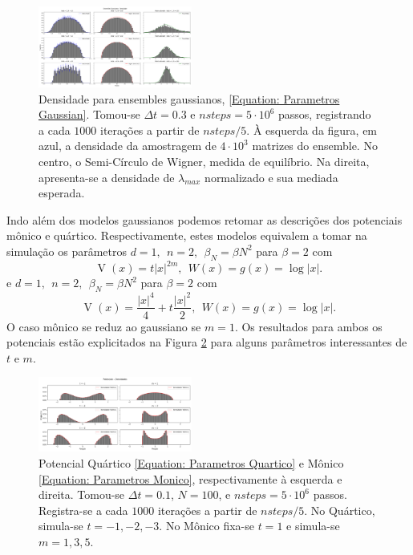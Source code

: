 \documentclass[11pt,twocolumn]{article}
\DeclareMathOperator{\V}{V}
\numberwithin{equation}{section} %
\begin{document}
\begin{figure}[ht!]
	\centering
	\includegraphics[width=0.45\textwidth]{figures/validationGaussianTracy.png}
	\caption{Densidade para ensembles gaussianos, \ref{Equation: Parametros Gaussian}. Tomou-se $\Delta t = 0.3$ e $nsteps = 5\cdot10^6$ passos, registrando a cada $1000$ iterações a partir de $nsteps/5$. À esquerda da figura, em azul, a densidade da amostragem de $4\cdot10^3$ matrizes do ensemble. No centro, o Semi-Círculo de Wigner, medida de equilíbrio. Na direita, apresenta-se a densidade de $\lambda_{max}$ normalizado e sua mediada esperada.}
	\label{Figura: Gaussian}
\end{figure}

Indo além dos modelos gaussianos podemos retomar as descrições dos potenciais mônico e quártico. Respectivamente, estes modelos equivalem a tomar na simulação os parâmetros $d = 1, \ \  n = 2, \ \ \beta_N = \beta N^2$ para $\beta = 2$ com
\begin{equation}
	\V(x)= t |x|^{2m}, \ \ W(x) = g(x) = \log{|x|}.
	\label{Equation: Parametros Monico}
\end{equation}
e $d = 1, \ \  n = 2, \ \ \beta_N = \beta N^2$ para $\beta = 2$ com
\begin{equation}
\V(x)=\frac{|x|^4}{4} + t \frac{|x|^2}{2}, \ \ W(x) = g(x) = \log{|x|}.
	\label{Equation: Parametros Quartico}
\end{equation}
O caso mônico se reduz ao gaussiano se $m=1$. Os resultados para ambos os potenciais estão explicitados na Figura \ref{Figura: Quartic Monic} para alguns parâmetros interessantes de $t$ e $m$.
\begin{figure}[ht!]
	\centering
	\includegraphics[width=0.45\textwidth]{figures/validationQuarticMonic-alt.png}
	\caption{Potencial Quártico \ref{Equation: Parametros Quartico} e Mônico \ref{Equation: Parametros Monico}, respectivamente à esquerda e direita. Tomou-se $\Delta t = 0.1$, $N=100$, e $nsteps = 5\cdot10^6$ passos. Registra-se a cada $1000$ iterações a partir de $nsteps/5$. No Quártico, simula-se $t=-1,-2,-3$. No Mônico fixa-se $t=1$ e simula-se $m=1,3,5$.}
	\label{Figura: Quartic Monic}
\end{figure}
\end{document}

